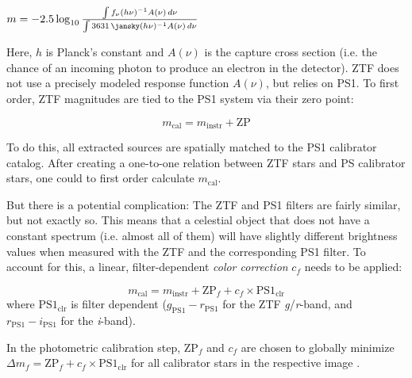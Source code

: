 \begin{definition}
$m = -2.5 \log_{10}{\frac{\int{f_\nu(h \nu)^{-1}A(\nu)\,d\nu}}{\int{\SI{3631}{\jansky}(h \nu)^{-1}A(\nu)\,d\nu }}}$
\end{definition}
Here, $h$ is Planck's constant and $A(\nu)$ is the capture cross section (i.e. the chance of an incoming photon to produce an electron in the detector). ZTF does not use a precisely modeled response function $A(\nu)$, but relies on PS1. To first order, ZTF magnitudes are tied to the PS1 system via their zero point:

\begin{equation}
m_\text{cal} = m_\text{instr} + \text{ZP}
\end{equation}

To do this, all extracted sources are spatially matched to the PS1 calibrator catalog. After creating a one-to-one relation between ZTF stars and PS calibrator stars, one could to first order calculate $m_\text{cal}$.

But there is a potential complication: The ZTF and PS1 filters are fairly similar, but not exactly so. This means that a celestial object that does not have a constant spectrum (i.e. almost all of them) will have slightly different brightness values when measured with the ZTF and the corresponding PS1 filter. To account for this, a linear, filter-dependent \textit{color correction} $c_f$ needs to be applied:

\begin{equation}
m_\text{cal} = m_\text{instr} + \text{ZP}_f + c_f \times \text{PS1}_\text{clr}
\end{equation}
where $\text{PS1}_\text{clr}$ is filter dependent ($g_\text{PS1}-r_\text{PS1}$ for the ZTF \textit{g}/\textit{r}-band, and $r_\text{PS1}-i_\text{PS1}$ for the \textit{i}-band).

In the photometric calibration step, $\text{ZP}_f$ and $c_f$ are chosen to globally minimize $\Delta m_f = \text{ZP}_f + c_f \times \text{PS1}_\text{clr}$ for all calibrator stars in the respective image \cite{Masci2019a}.

